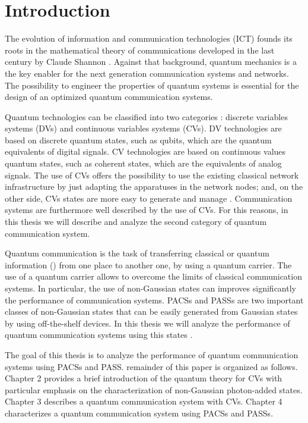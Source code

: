\chapter{Introduction}
    The evolution of information and communication technologies (ICT) founds its roots in the mathematical
    theory of communications developed in the last century by Claude Shannon \cite{shannon}.
    Against that background, quantum mechanics is a the key enabler for the next generation 
    communication systems and networks.
    The possibility to engineer the properties of quantum systems \cite{helstrom3} is essential for 
    the design of an optimized quantum communication systems.
    
    Quantum technologies can be classified into two categories \cite{tesiGuerrini}: discrete 
    variables systems (DVs) and continuous variables systems (CVs). DV technologies are based
    on discrete quantum states, such as qubits, which are the quantum equivalents of digital
    signals. CV technologies are based on continuous values quantum states, such as 
    coherent states, which are the equivalents of analog signals.
    The use of CVs offers the possibility to use the existing classical network
    infrastructure by just adapting the apparatuses in the network nodes; and, on the other
    side, CVs states are more easy to generate and manage \cite{tesiGuerrini}. Communication
    systems are furthermore well described by the use of CVs. 
    For this reasons, in this thesis we will describe and analyze the second category of quantum
    communication system.

    Quantum communication is the task of transferring classical or quantum information
    (\cite{GueChiWinCon:C20,GueChiWinCon:C19,GueChiCon:C18,ChiConWin:J20}) from one place to another
    one, by using a quantum carrier.
    The use of a quantum carrier allows to overcome the 
    limits of classical communication systems.
    In particular, the use of non-Gaussian states
    can improves significantly the performance of communication systems. 
    PACSs and PASSs are two important classes of non-Gaussian states that can be easily generated 
    from Gaussian states by using off-the-shelf devices. In this thesis we will analyze the 
    performance of quantum communication systems using this states 
    \cite{PACSDisc,GueChiWinCon:C20,GueChiWinCon:C19,GueChiCon:C18}.

    The goal of this thesis is to analyze the performance of quantum 
    communication systems using PACSs and PASS. remainder of this paper is organized as follows. 
    Chapter 2 provides a brief introduction of the quantum theory for CVs with particular emphasis on
    the characterization of non-Gaussian photon-added states. Chapter 3 describes a quantum communication 
    system with CVs. Chapter 4 characterizes a quantum communication system using PACSs and PASSs.
